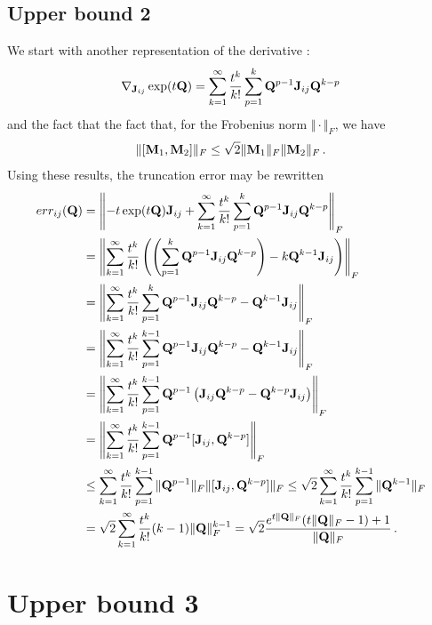 \documentclass[12pt]{article} %
\begin{document}
\subsection{Upper bound 2}

We start with another representation of the derivative \citep{al2009computing}:
\begin{align*}
	\nabla_{\mathbf{J}_{ij}} \exp(t\mathbf{Q}) = \sum_{k=1}^\infty \frac{t^k}{k!} \sum_{p=1}^k \mathbf{Q}^{p-1} \mathbf{J}_{ij} \mathbf{Q}^{k-p} 
\end{align*}
and the fact that
the fact that, for the Frobenius norm $\Vert \cdot \Vert_F$, we have \citep{wu2010short}
\begin{align*}
	\Vert [\mathbf{M}_1,\mathbf{M}_2] \Vert_F \leq \sqrt{2} \Vert \mathbf{M}_1 \Vert_F \Vert \mathbf{M}_2\Vert_F \, .
\end{align*}
Using these results, the truncation error may be rewritten
\begin{align*}
err_{ij}(\mathbf{Q})  &=\left\Vert - t\exp(t\mathbf{Q}) \mathbf{J}_{ij}  +  \sum_{k=1}^\infty \frac{t^k}{k!} \sum_{p=1}^k \mathbf{Q}^{p-1} \mathbf{J}_{ij} \mathbf{Q}^{k-p}\right\Vert_F \\
&= \left\Vert \sum_{k=1}^\infty \frac{t^k}{k!} \left( \left( \sum_{p=1}^k \mathbf{Q}^{p-1} \mathbf{J}_{ij} \mathbf{Q}^{k-p} \right) - k \mathbf{Q}^{k-1} \mathbf{J}_{ij} \right)  \right\Vert_F\\
&= \left\Vert \sum_{k=1}^\infty \frac{t^k}{k!} \sum_{p=1}^k \mathbf{Q}^{p-1} \mathbf{J}_{ij} \mathbf{Q}^{k-p}  -  \mathbf{Q}^{k-1} \mathbf{J}_{ij} \right\Vert_F \\
&=\left\Vert  \sum_{k=1}^\infty \frac{t^k}{k!} \sum_{p=1}^{k-1} \mathbf{Q}^{p-1} \mathbf{J}_{ij} \mathbf{Q}^{k-p}  -  \mathbf{Q}^{k-1} \mathbf{J}_{ij}\right\Vert_F \\
&=\left\Vert  \sum_{k=1}^\infty \frac{t^k}{k!} \sum_{p=1}^{k-1} \mathbf{Q}^{p-1}\left( \mathbf{J}_{ij} \mathbf{Q}^{k-p}  -  \mathbf{Q}^{k-p} \mathbf{J}_{ij} \right)\right\Vert_F \\
&= \left\Vert  \sum_{k=1}^\infty \frac{t^k}{k!} \sum_{p=1}^{k-1} \mathbf{Q}^{p-1}[\mathbf{J}_{ij}, \mathbf{Q}^{k-p}] \right\Vert_F  \\
&\leq  \sum_{k=1}^\infty \frac{t^k}{k!} \sum_{p=1}^{k-1} \Vert \mathbf{Q}^{p-1} \Vert_F \Vert[\mathbf{J}_{ij}, \mathbf{Q}^{k-p}]\Vert_F 
\leq \sqrt{2}  \sum_{k=1}^\infty \frac{t^k}{k!} \sum_{p=1}^{k-1} \Vert \mathbf{Q}^{k-1} \Vert_F  \\
&= \sqrt{2}  \sum_{k=1}^\infty \frac{t^k}{k!} (k-1) \Vert \mathbf{Q} \Vert_F^{k-1} = \sqrt{2} \frac{e^{t\Vert \mathbf{Q}\Vert_F}(t\Vert\mathbf{Q}\Vert_F - 1) + 1}{\Vert \mathbf{Q} \Vert_F} \, .
\end{align*}

\section{Upper bound 3}
\end{document}
